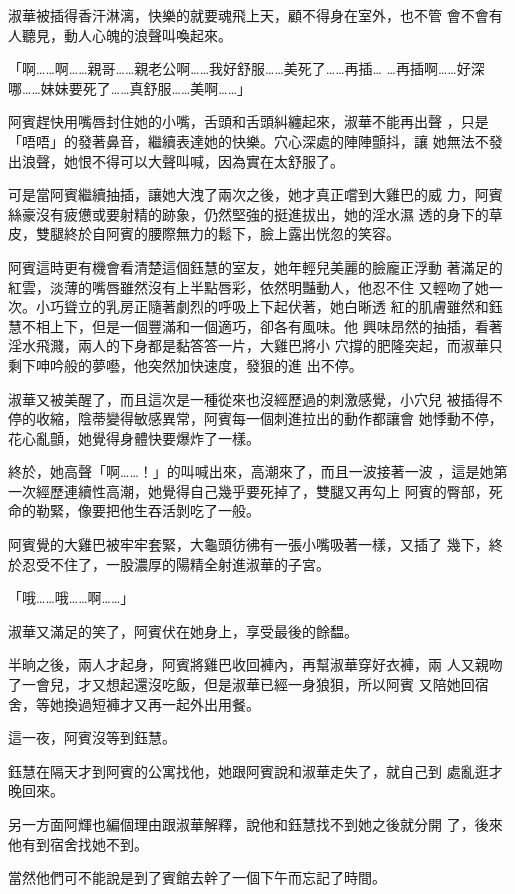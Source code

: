 淑華被插得香汗淋漓，快樂的就要魂飛上天，顧不得身在室外，也不管
會不會有人聽見，動人心魄的浪聲叫喚起來。

「啊……啊……親哥……親老公啊……我好舒服……美死了……再插…
…再插啊……好深哪……妹妹要死了……真舒服……美啊……」

阿賓趕快用嘴唇封住她的小嘴，舌頭和舌頭糾纏起來，淑華不能再出聲
，只是「唔唔」的發著鼻音，繼續表達她的快樂。穴心深處的陣陣顫抖，讓
她無法不發出浪聲，她恨不得可以大聲叫喊，因為實在太舒服了。

可是當阿賓繼續抽插，讓她大洩了兩次之後，她才真正嚐到大雞巴的威
力，阿賓絲豪沒有疲憊或要射精的跡象，仍然堅強的挺進拔出，她的淫水濕
透的身下的草皮，雙腿終於自阿賓的腰際無力的鬆下，臉上露出恍忽的笑容。

阿賓這時更有機會看清楚這個鈺慧的室友，她年輕兒美麗的臉龐正浮動
著滿足的紅雲，淡薄的嘴唇雖然沒有上半點唇彩，依然明豔動人，他忍不住
又輕吻了她一次。小巧聳立的乳房正隨著劇烈的呼吸上下起伏著，她白晰透
紅的肌膚雖然和鈺慧不相上下，但是一個豐滿和一個適巧，卻各有風味。他
興味昂然的抽插，看著淫水飛濺，兩人的下身都是黏答答一片，大雞巴將小
穴撐的肥隆突起，而淑華只剩下呻吟般的夢囈，他突然加快速度，發狠的進
出不停。

淑華又被美醒了，而且這次是一種從來也沒經歷過的刺激感覺，小穴兒
被插得不停的收縮，陰蒂變得敏感異常，阿賓每一個刺進拉出的動作都讓會
她悸動不停，花心亂顫，她覺得身體快要爆炸了一樣。

終於，她高聲「啊……！」的叫喊出來，高潮來了，而且一波接著一波
，這是她第一次經歷連續性高潮，她覺得自己幾乎要死掉了，雙腿又再勾上
阿賓的臀部，死命的勒緊，像要把他生吞活剝吃了一般。

阿賓覺的大雞巴被牢牢套緊，大龜頭彷彿有一張小嘴吸著一樣，又插了
幾下，終於忍受不住了，一股濃厚的陽精全射進淑華的子宮。

「哦……哦……啊……」

淑華又滿足的笑了，阿賓伏在她身上，享受最後的餘馧。

半晌之後，兩人才起身，阿賓將雞巴收回褲內，再幫淑華穿好衣褲，兩
人又親吻了一會兒，才又想起還沒吃飯，但是淑華已經一身狼狽，所以阿賓
又陪她回宿舍，等她換過短褲才又再一起外出用餐。

這一夜，阿賓沒等到鈺慧。

鈺慧在隔天才到阿賓的公寓找他，她跟阿賓說和淑華走失了，就自己到
處亂逛才晚回來。

另一方面阿輝也編個理由跟淑華解釋，說他和鈺慧找不到她之後就分開
了，後來他有到宿舍找她不到。

當然他們可不能說是到了賓館去幹了一個下午而忘記了時間。










